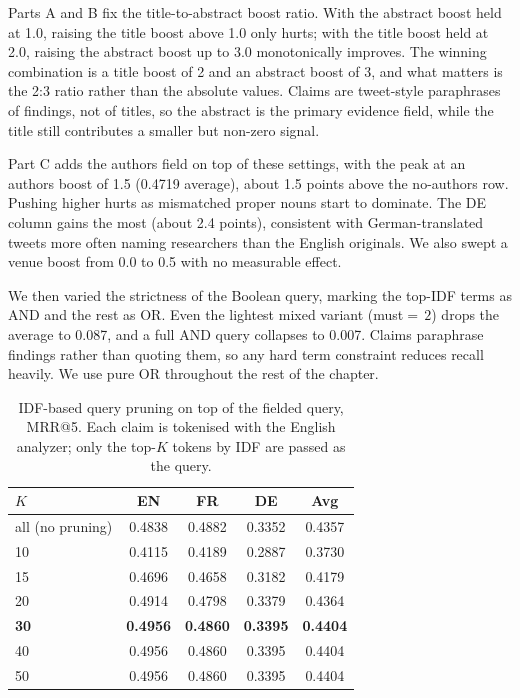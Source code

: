 Parts A and B fix the title-to-abstract boost ratio. With the abstract boost held at 1.0, raising the title boost above 1.0 only hurts; with the title boost held at 2.0, raising the abstract boost up to 3.0 monotonically improves. The winning combination is a title boost of 2 and an abstract boost of 3, and what matters is the 2:3 ratio rather than the absolute values. Claims are tweet-style paraphrases of findings, not of titles, so the abstract is the primary evidence field, while the title still contributes a smaller but non-zero signal.

Part C adds the authors field on top of these settings, with the peak at an authors boost of 1.5 (0.4719 average), about 1.5 points above the no-authors row. Pushing higher hurts as mismatched proper nouns start to dominate. The DE column gains the most (about 2.4 points), consistent with German-translated tweets more often naming researchers than the English originals. We also swept a venue boost from 0.0 to 0.5 with no measurable effect.

We then varied the strictness of the Boolean query, marking the top-IDF terms as AND and the rest as OR\@. Even the lightest mixed variant (must${=}\,2$) drops the average to 0.087, and a full AND query collapses to 0.007. Claims paraphrase findings rather than quoting them, so any hard term constraint reduces recall heavily. We use pure OR throughout the rest of the chapter.

\begin{table}[!ht]
    \caption{IDF-based query pruning on top of the fielded query, MRR@5. Each claim is tokenised with the English analyzer; only the top-$K$ tokens by IDF are passed as the query.}
    \label{tab:topk-pruning}
    \centering
    \begin{tabular}{lcccc}
        \toprule
        $K$ & EN & FR & DE & Avg \\
        \midrule
        all (no pruning)   & 0.4838 & 0.4882 & 0.3352 & 0.4357 \\
        10                 & 0.4115 & 0.4189 & 0.2887 & 0.3730 \\
        15                 & 0.4696 & 0.4658 & 0.3182 & 0.4179 \\
        20                 & 0.4914 & 0.4798 & 0.3379 & 0.4364 \\
        \textbf{30}        & \textbf{0.4956} & \textbf{0.4860} & \textbf{0.3395} & \textbf{0.4404} \\
        40                 & 0.4956 & 0.4860 & 0.3395 & 0.4404 \\
        50                 & 0.4956 & 0.4860 & 0.3395 & 0.4404 \\
        \bottomrule
    \end{tabular}
\end{table}

